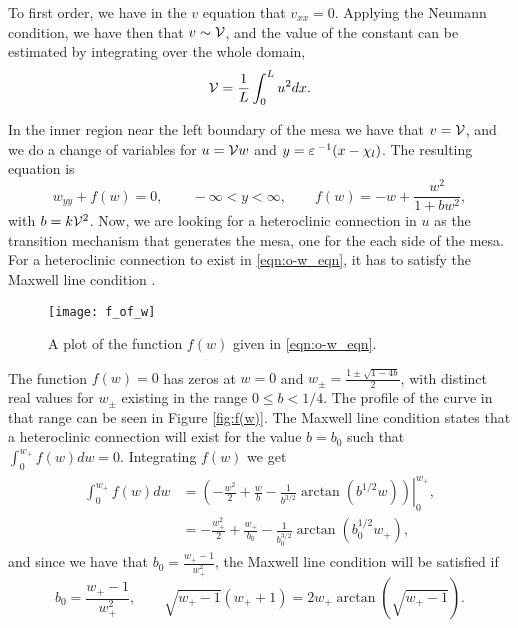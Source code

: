 To first order, we have in the $v$ equation that $v_{xx}=0$. Applying the Neumann condition, we have then that $v\sim\mathcal{V}$, and the value of the constant can be estimated by integrating over the whole domain,
% 
\begin{equation}
\label{eqn:o-v_first_order}
  \mathcal{V} = \frac{1}{L}\int_0^Lu^2dx.
\end{equation}
% 

In the inner region near the left boundary of the mesa we have that $v=\mathcal{V}$, and we do a change of variables for $u=\mathcal{V} w$ and $y=\varepsilon\,^{-1}(x-\chi_l)$. The resulting equation is
% 
\begin{equation}
\label{eqn:o-w_eqn}
  w_{yy}+f(w)=0, \qquad -\infty<y<\infty,\qquad f(w) = -w + \frac{w^2}{1+bw^2},
\end{equation}
% 
with $b = k\mathcal{V}^2$. Now, we are looking for a heteroclinic connection in $u$ as the transition mechanism that generates the mesa, one for the each side of the mesa. For a heteroclinic connection to exist in \eqref{eqn:o-w_eqn}, it has to satisfy the Maxwell line condition \cite{maxwell1994}.
% 
\begin{figure}[htb]
\begin{center}
\texttt{[image: f\_of\_w]}
\caption{A plot of the function $f(w)$ given in \eqref{eqn:o-w_eqn}.}
\label{fig:f(w)}
\end{center}
\end{figure}
% 

The function $f(w)=0$ has zeros at $w=0$ and $w_{\pm} = \frac{1\pm\sqrt{1-4b}}{2}$, with distinct real values for $w_{\pm}$ existing in the range $0\le b<1/4$. The profile of the curve in that range can be seen in Figure \eqref{fig:f(w)}. The Maxwell line condition states that a heteroclinic connection will exist for the value $b=b_0$ such that $\int_0^{w_+} f(w)dw = 0$. Integrating $f(w)$ we get
% 
\begin{equation*}
\begin{split}
\begin{aligned}
  \int_0^{w_+} f(w)dw &= \left.\left(-\frac{w^2}{2} + \frac{w}{b} - \frac{1}{b^{3/2}}\arctan(b^{1/2}w) \right)\right|_0^{w_+},\\
  & = -\frac{w_+^2}{2} + \frac{w_+}{b_0} - \frac{1}{b_0^{3/2}}\arctan(b_0^{1/2}w_+),
\end{aligned}
\end{split}
\end{equation*}
% 
and since we have that $b_0 = \frac{w_+-1}{w_+^2}$, the Maxwell line condition will be satisfied if
% 
\begin{equation}
\label{eqn:maxwell2}
b_0 = \frac{w_+-1}{w_+^2},\qquad \sqrt{w_+-1}(w_++1)=2w_+\arctan(\sqrt{w_+-1}).
\end{equation}

